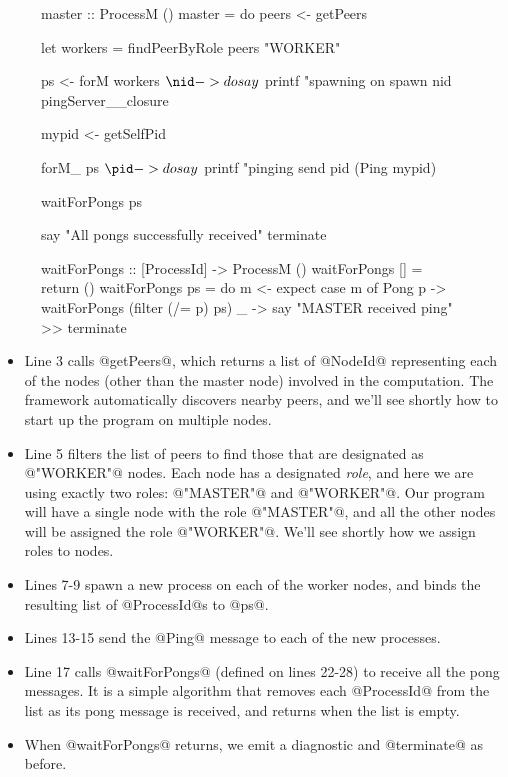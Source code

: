 \begin{figure}
\begin{numhaskell}
master :: ProcessM ()
master = do
  peers <- getPeers

  let workers = findPeerByRole peers "WORKER"

  ps <- forM workers $ \nid -> do
          say $ printf "spawning on %
          spawn nid pingServer__closure

  mypid <- getSelfPid

  forM_ ps $ \pid -> do
    say $ printf "pinging %
    send pid (Ping mypid)

  waitForPongs ps

  say "All pongs successfully received"
  terminate

waitForPongs :: [ProcessId] -> ProcessM ()
waitForPongs [] = return ()
waitForPongs ps = do
  m <- expect
  case m of
    Pong p -> waitForPongs (filter (/= p) ps)
    _  -> say "MASTER received ping" >> terminate
\end{numhaskell}
\label{fig:ping-multi}
\end{figure}

\begin{itemize}
\item Line 3 calls @getPeers@, which returns a list of @NodeId@
  representing each of the nodes (other than the master node) involved
  in the computation.  The framework automatically discovers nearby
  peers, and we'll see shortly how to start up the program on multiple
  nodes.

\item Line 5 filters the list of peers to find those that are
  designated as @"WORKER"@ nodes.  Each node has a designated
  \emph{role}, and here we are using exactly two roles: @"MASTER"@ and
  @"WORKER"@.  Our program will have a single node with the role
  @"MASTER"@, and all the other nodes will be assigned the role
  @"WORKER"@.  We'll see shortly how we assign roles to nodes.

\item Lines 7-9 spawn a new process on each of the worker nodes, and
  binds the resulting list of @ProcessId@s to @ps@.

\item Lines 13-15 send the @Ping@ message to each of the new
  processes.

\item Line 17 calls @waitForPongs@ (defined on lines 22-28) to receive
  all the pong messages.  It is a simple algorithm that removes each
  @ProcessId@ from the list as its pong message is received, and
  returns when the list is empty.

\item When @waitForPongs@ returns, we emit a diagnostic and
  @terminate@ as before.
\end{itemize}

